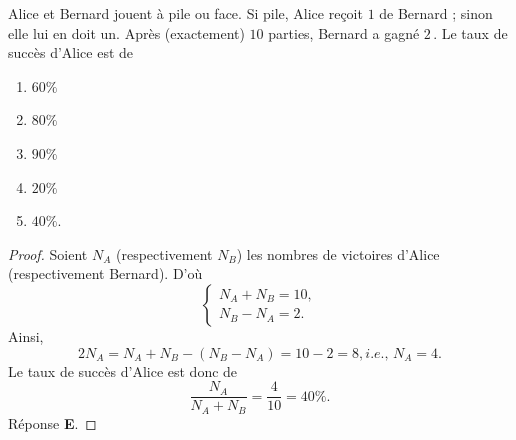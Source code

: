 %
%
Alice et Bernard jouent à pile ou face. Si pile, Alice reçoit $1$\,\currency\,de Bernard ;
sinon elle lui en doit un. Après (exactement) $10$ parties, Bernard a gagné $2$\,\currency. %
Le taux de succès d'Alice est de
%
\begin{enumerate}
  \item $60\%$
  \item $80\%$
  \item $90\%$
  \item $20\%$
  \item $40\%$.
\end{enumerate}
%
%
\begin{proof}%
Soient $N_A$ (respectivement $N_B$) les nombres de victoires d'Alice (respectivement Bernard). %
D'où 
%
\begin{equation}
  \begin{cases}
    N_A + N_B = 10, \\
    N_B - N_A = 2.
  \end{cases}
\end{equation}
%
Ainsi, %
%
\begin{equation}
  2N_A = N_A  + N_B - (N_B - N_A) = 10 -2 = 8, \textit{i.e., } N_A = 4.
\end{equation}
% 
Le taux de succès d'Alice est donc de 
%
\begin{equation}
  \frac{N_A}{N_A+ N_B} = \frac{4}{10} = 40\%.
\end{equation}
%
Réponse \textbf{E}.
\end{proof}